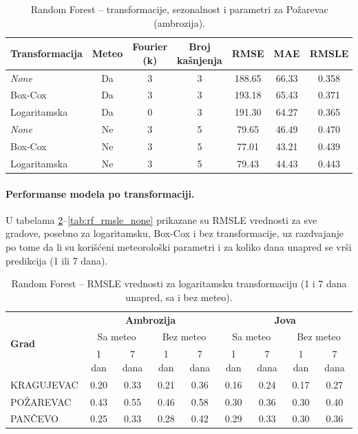 \documentclass[12pt]{article}
\begin{document}
\begin{table}[h!]
    \label{tab:rf_params}
\centering
\caption{Random Forest – transformacije, sezonalnost i parametri za Požarevac (ambrozija).}

\renewcommand{\arraystretch}{1.3}
\begin{tabular}{|l|c|c|c|c|c|c|}
\hline
\textbf{Transformacija} & \textbf{Meteo} & \textbf{Fourier (k)} & \textbf{Broj kašnjenja} & \textbf{RMSE} & \textbf{MAE} & \textbf{RMSLE} \\ \hline
\textit{None}   & Da  & 3 & 3 & 188.65 & 66.33 & 0.358 \\ \hline
Box-Cox & Da  & 3 & 3 & 193.18 & 65.43 & 0.371 \\ \hline
Logaritamska    & Da  & 0 & 3 & 191.30 & 64.27 & 0.365 \\ \hline
\textit{None}   & Ne  & 3 & 5 & 79.65 & 46.49 & 0.470 \\ \hline
Box-Cox & Ne  &  3 & 5 & 77.01 & 43.21 & 0.439 \\ \hline
Logaritamska    & Ne  & 3 & 5 & 79.43 & 44.43 & 0.443 \\ \hline
\end{tabular}
\end{table}

\paragraph{\textbf{Performanse modela po transformaciji.}}  
U tabelama \ref{tab:rf_rmsle_log}–\ref{tab:rf_rmsle_none} prikazane su RMSLE vrednosti za sve gradove, posebno za logaritamsku, Box-Cox i bez transformacije, uz razdvajanje po tome da li su korišćeni meteorološki parametri i za koliko dana unapred se vrši predikcija (1 ili 7 dana). 

\begin{table}[h!]
\centering
\caption{Random Forest – RMSLE vrednosti za logaritamsku transformaciju (1 i 7 dana unapred, sa i bez meteo).}
\label{tab:rf_rmsle_log}
\begin{tabular}{|l|c|c|c|c||c|c|c|c|}
\hline
\multirow{3}{*}{\textbf{Grad}} 
& \multicolumn{4}{c||}{\textbf{Ambrozija}} 
& \multicolumn{4}{c|}{\textbf{Jova}} \\ \cline{2-9}
& \multicolumn{2}{c|}{Sa meteo} & \multicolumn{2}{c||}{Bez meteo} 
& \multicolumn{2}{c|}{Sa meteo} & \multicolumn{2}{c|}{Bez meteo} \\ \cline{2-9}
& 1 dan & 7 dana & 1 dan & 7 dana & 1 dan & 7 dana & 1 dan & 7 dana \\ \hline
KRAGUJEVAC & 0.20 & 0.33 & 0.21 & 0.36 & 0.16 & 0.24 & 0.17 & 0.27 \\ \hline
POŽAREVAC  & 0.43 & 0.55 & 0.46 & 0.58 & 0.30 & 0.36 & 0.30 & 0.40 \\ \hline
PANČEVO    & 0.25 & 0.33 & 0.28 & 0.42 & 0.29 & 0.33 & 0.30 & 0.36 \\ \hline
\end{tabular}
\end{table}
\end{document}
